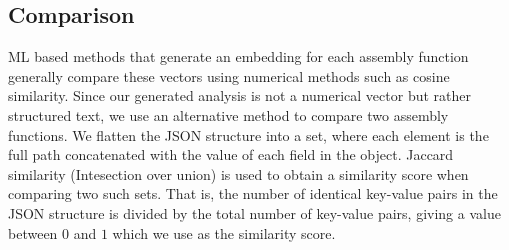 \subsection{Comparison}
{
    \renewcommand{\arraystretch}{1.1}
    \begin{table}
    \centering
    \caption{Dataset details.}
    \end{table}
}

ML based methods that generate an embedding for each assembly function generally compare these vectors using numerical
methods such as cosine similarity.  Since our generated analysis is not a numerical vector but rather structured text,
we use an alternative method to compare two assembly functions. We flatten the JSON structure into a set, where each
element is the full path concatenated with the value of each field in the object. Jaccard similarity (Intesection over union)
is used to obtain a similarity score when comparing two such sets. That is, the number of identical key-value pairs in the JSON
structure is divided by the total number of key-value pairs, giving a value between \(0\) and \(1\) which we use as the similarity score.


